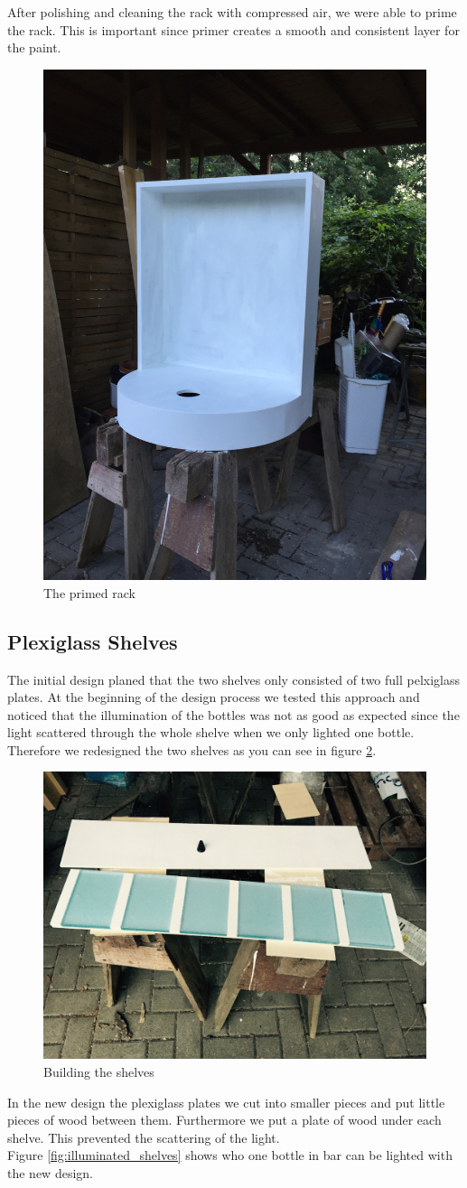 \documentclass{acm_proc_article-sp}
\begin{document}
After polishing and cleaning the rack with compressed air, we were able to prime the rack. This is important since primer creates a smooth and consistent layer for the paint.

\begin{figure}[htbp] 
  \centering
     \includegraphics[width=0.6\linewidth, angle =270]{pictures/rack3.jpg}
  \caption{The primed rack}
  \label{fig:priming}
\end{figure}



\subsection{Plexiglass Shelves}
The initial design planed that the two shelves only consisted of two full pelxiglass plates. At the beginning of the design process we tested this approach and noticed that the illumination of the bottles was not as good as expected since the light scattered through the whole shelve when we only lighted one bottle. Therefore we redesigned the two shelves as you can see in figure \ref{fig:building_shelves}. 

\begin{figure}[htbp] 
  \centering
     \includegraphics[width=0.5\linewidth]{pictures/plexiglass.jpg}
  \caption{Building the shelves}
  \label{fig:building_shelves}
\end{figure}
In the new design the plexiglass plates we cut into smaller pieces and put little pieces of wood between them. Furthermore we put a plate of wood under each shelve. This prevented the scattering of the light.\\
Figure \ref{fig:illuminated_shelves} shows who one bottle in bar can be lighted with the new design.
\end{document}
